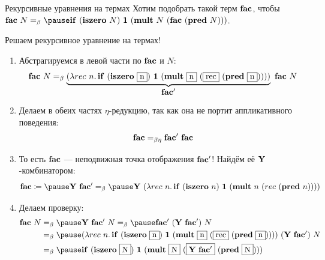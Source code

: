     \begin{frame}{Рекурсивные уравнения на термах}
        Хотим подобрать такой терм $\mathbf{fac}$, чтобы $\term{fac} \ap N \eqbeta \pause \term{if} \ap (\term{iszero} \ap N) \ap \term{1} \ap (\term{mult} \ap N \ap (\term{fac} \ap (\term{pred} \ap N)))$.

        \pause
        \vspace{0.5em}
        Решаем рекурсивное уравнение на термах!
        \begin{enumerate}
            \item \pause Абстрагируемся в левой части по $\mathbf{fac}$ и $N$:
            \[
                \term{fac} \ap N
                \eqbeta
                \underbrace{(\lambda rec \ap n \ldotp \term{if} \ap (\term{iszero} \ap \framebox{n}) \ap \term{1} \ap (\term{mult} \ap \framebox{n} \ap (\framebox{rec} \ap (\term{pred} \ap \framebox{n}))))}_{\textstyle \term{fac'}}
                \ap \term{fac} \ap N
            \]
            \item \pause Делаем в обеих частях $\eta$-редукцию, так как она не портит аппликативного поведения:
            \[
                \mathbf{fac} =_{\beta\eta} \mathbf{fac'} ~ \mathbf{fac}
            \]
            \item \pause То есть $\mathbf{fac}$ --- неподвижная точка отображения $\mathbf{fac'}$!  Найдём её $\mathbf{Y}$-комбинатором:
            \[
                \term{fac}
                \termdef \pause
                \comb{Y} \ap \term{fac'}
                \eqt_{\beta} \pause
                \comb{Y} \ap (\lambda rec \ap n \ldotp \term{if} \ap (\term{iszero} \ap n) \ap \term{1} \ap (\term{mult} \ap n \ap (rec \ap (\term{pred} \ap n))))
            \]
            \vspace{-1em}
            \item \pause Делаем проверку:
            \begin{align*}
                \term{fac} \ap N
                &\eqbeta \pause
                \comb{Y} \ap \term{fac'} \ap N
                \eqbeta \pause
                \term{fac'} \ap (\comb{Y} \ap \term{fac'}) \ap N
                \\&\eqbeta \pause
                (\lambda rec \ap n \ldotp \term{if} \ap (\term{iszero} \ap \framebox{n}) \ap \term{1} \ap (\term{mult} \ap \framebox{n} \ap (\framebox{rec} \ap (\term{pred} \ap \framebox{n})))) \ap (\comb{Y} \ap \term{fac'}) \ap N
                \\&\eqbeta \pause
                \term{if} \ap (\term{iszero} \ap \framebox{N}) \ap \term{1} \ap (\term{mult} \ap \framebox{N} \ap (\framebox{$\comb{Y} \ap \term{fac'}$} \ap (\term{pred} \ap \framebox{N})))
            \end{align*}
        \end{enumerate}
    \end{frame}


